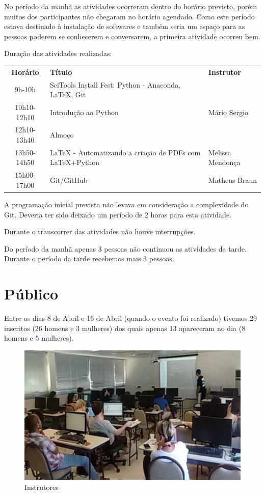 \documentclass[12pt]{article}
\begin{document}
No período da manhã as atividades ocorreram dentro do horário previsto, porém muitos dos participantes não chegaram no horário agendado. Como este período estava destinado à instalação de softwares e também seria um espaço para as pessoas poderem se conhecerem e conversarem, a primeira atividade ocorreu bem.

Duração das atividades realizadas:

\begin{tabular}{cp{}l}
  \textbf{Horário} & \textbf{Título} & \textbf{Instrutor} \\
  9h-10h & SciTools Install Fest: Python - Anaconda, LaTeX, Git & \\
  10h10-12h10 & Introdução ao Python & Mário Sergio \\
  12h10-13h40 & Almoço \\
  13h50-14h50 & LaTeX - Automatizando a criação de PDFs com LaTeX+Python & Melissa Mendonça \\
  15h00-17h00 & Git/GitHub & Matheus Braun \\
\end{tabular}

A programação inicial prevista não levava em consideração a complexidade do Git. Deveria ter sido deixado um período de 2 horas para esta atividade.

Durante o transcorrer das atividades não houve interrupções.

Do período da manhã apenas 3 pessoas não continuou as atividades da tarde. 
Durante o período da tarde recebemos mais 3 pessoas.

\newpage

\section*{Público}

Entre os dias 8 de Abril e 16 de Abril (quando o evento foi realizado)
tivemos 29 inscritos (26 homens e 3 mulheres) dos quais apenas 13 apareceram no
dia (8 homens e 5 mulheres).

\begin{figure}[!htb]
\includegraphics[width=\textwidth]{../../media/photos/pre0-cut}
\caption{Instrutores}
\end{figure}
\end{document}
